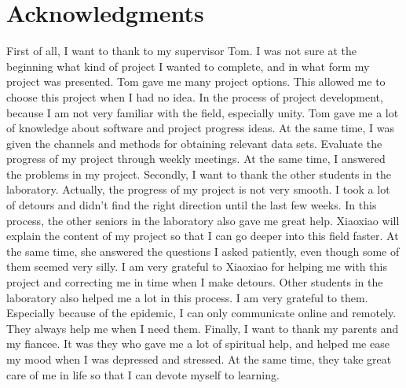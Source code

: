 \chapter*{Acknowledgments}
First of all, I want to thank to my supervisor Tom. I was not sure at the beginning what kind of project I wanted to complete, and in what form my project was presented. Tom gave me many project options. This allowed me to choose this project when I had no idea. In the process of project development, because I am not very familiar with the field, especially unity. Tom gave me a lot of knowledge about software and project progress ideas. At the same time, I was given the channels and methods for obtaining relevant data sets. Evaluate the progress of my project through weekly meetings. At the same time, I answered the problems in my project. Secondly, I want to thank the other students in the laboratory. Actually, the progress of my project is not very smooth. I took a lot of detours and didn't find the right direction until the last few weeks. In this process, the other seniors  in the laboratory also gave me great help. Xiaoxiao will explain the content of my project so that I can go deeper into this field faster. At the same time, she answered the questions I asked patiently, even though some of them seemed very silly. I am very grateful to Xiaoxiao for helping me with this project and correcting me in time when I make detours. Other students in the laboratory also helped me a lot in this process. I am very grateful to them. Especially because of the epidemic, I can only communicate online and remotely. They always help me when I need them. Finally, I want to thank my parents and my fiancee. It was they who gave me a lot of spiritual help, and helped me ease my mood when I was depressed and stressed. At the same time, they take great care of me in life so that I can devote myself to learning.
